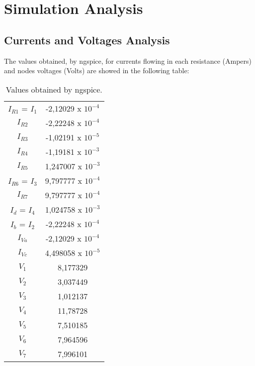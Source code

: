 \newpage
\section{Simulation Analysis}
\label{sec:simulation}

\subsection{Currents and Voltages Analysis}

The values obtained, by ngspice, for currents flowing in each resistance (Ampers) and nodes voltages (Volts) are showed in the following table:
\begin{table}[h!]
\centering
\begin{small}
\caption{Values obtained by ngspice.} \label{Table4}
\begin{tabular}{c|c}
\hline
$I_{R1}$ = $I_1$ & -2,12029 x $10^{-4}$\\
$I_{R2}$  & -2,22248 x $10^{-4}$ \\
$I_{R3}$ & -1,02191 x $10^{-5}$ \\
$I_{R4}$ & -1,19181 x $10^{-3}$ \\
$I_{R5}$ & 1,247007 x $10^{-3}$\\
$I_{R6}$ = $I_3$ & 9,797777 x $10^{-4}$ \\
$I_{R7}$ &  9,797777 x $10^{-4}$ \\
$I_d$ = $I_4$ &  1,024758 x $10^{-3}$\\
$I_b$ = $I_2$& -2,22248 x $10^{-4}$ \\
$I_{Va}$ & -2,12029 x $10^{-4}$\\
$I_{Vc}$ & 4,498058 x $10^{-5}$ \\
$V_1$ & 8,177329 \\
$V_2$ & 3,037449 \\
$V_3$ & 1,012137\\
$V_4$ & 11,78728 \\
$V_5$ & 7,510185 \\
$V_6$ & 7,964596 \\
$V_7$ & 7,996101\\
\hline
\end{tabular}
\end{small}
\end{table}








